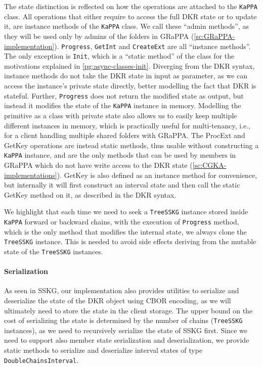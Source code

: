The state distinction is reflected on how the operations are attached
to the \texttt{KaPPA} class. All operations that either require
to access the full DKR state or to update it, are instance
methods of the \texttt{KaPPA} class. We call these ``admin methods'',
as they will be used only by admins of the folders in GRaPPA (\cref{sc:GRaPPA-implementation}).
\texttt{Progress}, \texttt{GetInt} and \texttt{CreateExt} 
are all ``instance methods''.
The only exception is \texttt{Init}, which is a ``static method'' 
of the class for the motivations explained in \cref{pg:async-classes-init}.
Diverging from the DKR syntax, instance methods do not take the DKR state in input
as parameter, as we can access the instance's private state directly,
better modelling the fact that DKR is stateful.
Further, \texttt{Progress} does not return the modified state as output, 
but instead it modifies the state of the \texttt{KaPPA} instance in memory.
Modelling the primitive as a class with private state also
allows us to easily keep multiple different instances
in memory, which is practically useful for multi-tenancy, i.e., 
for a client handling multiple shared folders with GRaPPA.
The ProcExt and GetKey operations are instead static methods,
thus usable without constructing a \texttt{KaPPA} instance,
and are the only methods that can be used by members in GRaPPA
which do not have write access to the DKR state (\cref{sc:CGKA-implementations}).
GetKey is also defined as an instance method for convenience,
but internally it will first construct an interval state and
then call the static GetKey method on it, as described in the
DKR syntax.

We highlight that each time we need to seek a \texttt{TreeSSKG}
instance stored inside \texttt{KaPPA} forward or backward chains,
with the execution of \texttt{Progress} method, which is the only method
that modifies the internal state, we always clone the \texttt{TreeSSKG}
instance. This is needed to avoid side effects
deriving from the mutable state of the \texttt{TreeSSKG} instances. 

\paragraph{Serialization} As seen in SSKG, our implementation also provides utilities
to serialize and deserialize the state of the DKR object
using CBOR encoding, as we will ultimately need to
store the state in the client storage.
The upper bound on the cost of serializing the state is determined
by the number of chains (\texttt{TreeSSKG} instances),
as we need to recursively serialize the state of SSKG first.
Since we need to support also member state serialization and deserialization,
we provide static methods to serialize and deserialize interval
states of type \texttt{DoubleChainsInterval}.

